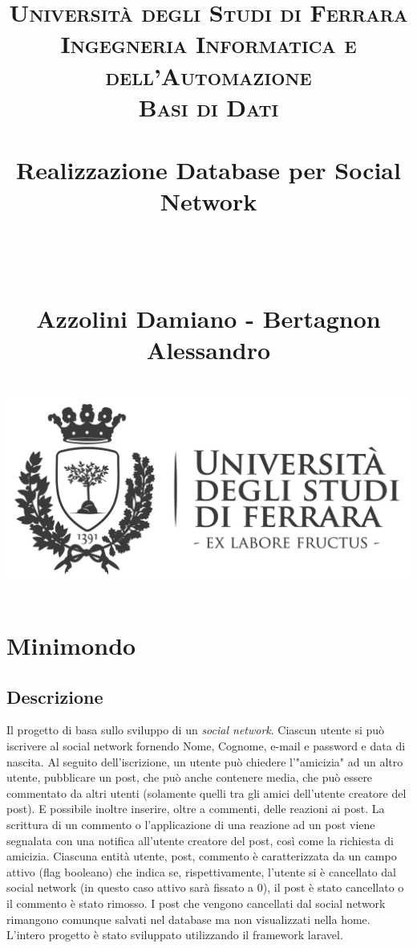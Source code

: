 \documentclass[paper=a4, fontsize=11pt,x11names]{report}
\title{
		\usefont{OT1}{bch}{b}{n}
		\normalfont \normalsize \textsc{Universit\`a degli Studi di Ferrara \\ Ingegneria Informatica e dell'Automazione
			\\ Basi di Dati} \\ [25pt]
		\horrule{0.5pt} \\[0.4cm]
		\Huge Realizzazione Database per Social Network \date{}\\%
		\horrule{0.5pt} \\[0.4cm]
		\LARGE Azzolini Damiano - Bertagnon Alessandro \\ [0.4cm]
		\horrule{2pt} \\[0.8cm]
		\includegraphics{logoUnife}
}
\begin{document}
\maketitle

\newpage

\tableofcontents
\thispagestyle{empty}

\listoffigures
\thispagestyle{empty}


\newpage





\chapter{Minimondo}
\section{Descrizione}
Il progetto di basa sullo sviluppo di un \textit{social network}. Ciascun utente si può iscrivere al social network
fornendo Nome, Cognome, e-mail e password e data di nascita. Al seguito dell'iscrizione, un utente può chiedere l'"amicizia" ad 
un altro utente, pubblicare un
post, che può anche contenere media, che può essere commentato da altri utenti (solamente quelli tra gli amici dell'utente creatore del post). E possibile inoltre inserire, oltre a commenti, delle reazioni ai post. 
La scrittura di un commento o l'applicazione di una reazione ad un post viene segnalata con una notifica all'utente creatore del post, così come la richiesta di amicizia. Ciascuna entità utente, post, commento è caratterizzata da un campo attivo (flag booleano) che indica se, rispettivamente, l'utente si è cancellato dal social network (in questo caso attivo sarà fissato a 0), il post è stato cancellato o il commento è stato rimosso. I post che vengono cancellati dal social network rimangono comunque salvati nel database ma non visualizzati nella home. L'intero progetto è stato sviluppato utilizzando il framework laravel.
\end{document}
